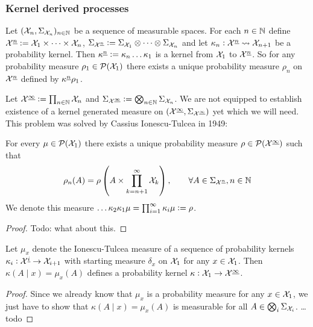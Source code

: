 \documentclass{article}
\begin{document}
\subsubsection{Kernel derived processes}

Let $(\mathcal{X}_n, \Sigma_{\mathcal{X}_n})_{n \in \mathbb{N}}$ be a sequence
of measurable spaces. For each $n \in \mathbb{N}$ define
$\mathcal{X}^{\underline{n}} \vcentcolon= \mathcal{X}_1 \times \dots \times \mathcal{X}_n$,
$\Sigma_{\mathcal{X}^{\underline{n}}} \vcentcolon= \Sigma_{\mathcal{X}_1} \otimes
\dots \otimes \Sigma_{\mathcal{X}_n}$
and let
$\kappa_n : \mathcal{X}^{\underline{n}} \leadsto \mathcal{X}_{n+1}$ be a probability kernel.
Then $\kappa^{\underline{n}} \vcentcolon= \kappa_n \dots \kappa_1$ is a kernel
from $\mathcal{X}_1$ to $\mathcal{X}^{\underline{n}}$.
So for any probability measure $\rho_1 \in \mathcal{P}(\mathcal{X}_1)$
there exists a unique probability measure 
$\rho_n$ on $\mathcal{X}^{\underline{n}}$ defined by
$\kappa^{\underline{n}} \rho_1$.

Let $\mathcal{X}^{\underline{\infty}} \vcentcolon= \prod_{n \in \mathbb{N}} \mathcal{X}_n$
and $\Sigma_{\mathcal{X}^{\underline{\infty}}} \vcentcolon= \bigotimes_{n \in \mathbb{N}}
\Sigma_{\mathcal{X}_n}$.
We are not equipped to establish existence of a
kernel generated measure on
$(\mathcal{X}^{\underline{\infty}}, \Sigma_{\mathcal{X}^{\underline{\infty}}})$ 
yet which we will need.
This problem was solved by Cassius Ionescu-Tulcea in 1949:

\begin{thm}
  For every $\mu \in \mathcal{P}(\mathcal{X}_1)$ 
  there exists a unique probability measure
  $\rho \in \mathcal{P}(\mathcal{X}^{\underline{\infty}})$ such that
  \[ \rho_n(A) = \rho \left( A \times \prod_{k=n+1}^\infty \mathcal{X}_k \right)
  , \qquad \forall A \in \Sigma_{\mathcal{X}^{\underline{n}}}, n \in \mathbb{N} \]
  We denote this measure
  $\dots \kappa_2 \kappa_1 \mu = \prod_{i=1}^\infty \kappa_i \mu \vcentcolon= \rho$.
  \label{thm:ionescuTulcea}
\end{thm}
\begin{proof}
  Todo: what about this.
\end{proof}

\begin{prop}
  Let $\mu_x$ denote the Ionescu-Tulcea measure of a
  sequence of probability kernels
  $\kappa_i : \mathcal{X}^{\underline{i}} \to \mathcal{X}_{i+1}$
  with starting measure $\delta_x$ on $\mathcal{X}_1$ for any $x \in \mathcal{X}_1$.
  Then $\kappa(A \mid x) = \mu_x(A)$ defines a probability kernel
  $\kappa : \mathcal{X}_1 \to \mathcal{X}^{\underline{\infty}}$.
\end{prop}
\begin{proof}
  Since we already know that $\mu_x$ is a probability measure for any
  $x \in \mathcal{X}_1$,
  we just have to show that $\kappa(A \mid x) = \mu_x(A)$ is measurable for all
  $A \in \bigotimes_i \Sigma_{\mathcal{X}_i}$.
  \dots todo
\end{proof}
\end{document}
